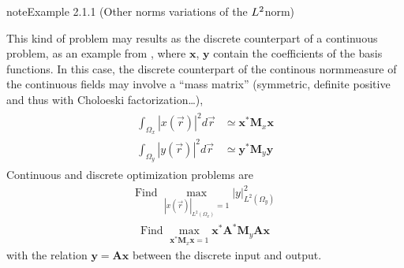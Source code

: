 \documentclass[letterpaper,10pt,english]{jupyterBook}
\begin{document}
\begin{sphinxadmonition}{note}{Example 2.1.1 (Other norms \sphinxhyphen{} variations of the \protect\(L^2\protect\)\sphinxhyphen{}norm)}



\sphinxAtStartPar
This kind of problem may results as the discrete counterpart of a continuous problem, as an example from , where \(\mathbf{x}\), \(\mathbf{y}\) contain the coefficients of the basis functions. In this case, the discrete counterpart of the continous norm\sphinxhyphen{}measure of the continuous fields may involve a “mass matrix” (symmetric, definite positive \sphinxhyphen{} and thus with Choloeski factorization…),
\begin{equation*}
\begin{split}\begin{aligned}
  \int_{\Omega_x} |x(\vec{r})|^2 d \vec{r} & \simeq \mathbf{x}^* \mathbf{M}_x \mathbf{x} \\
  \int_{\Omega_y} |y(\vec{r})|^2 d \vec{r} & \simeq \mathbf{y}^* \mathbf{M}_y \mathbf{y}
\end{aligned}\end{split}
\end{equation*}
\sphinxAtStartPar
Continuous and discrete optimization problems are
\begin{equation*}
\begin{split}\text{Find } \max_{|x(\vec{r})|_{L^2(\Omega_x)}=1} |y|^2_{L^2(\Omega_y)} \end{split}
\end{equation*}\begin{equation*}
\begin{split}\text{Find } \max_{\mathbf{x}^*\mathbf{M}_x  \mathbf{x}=1} \mathbf{x}^* \mathbf{A}^* \mathbf{M}_y \mathbf{A} \mathbf{x} \end{split}
\end{equation*}
\sphinxAtStartPar
with the relation \(\mathbf{y} = \mathbf{A} \mathbf{x}\) between the discrete input and output.


\end{sphinxadmonition}
\end{document}
